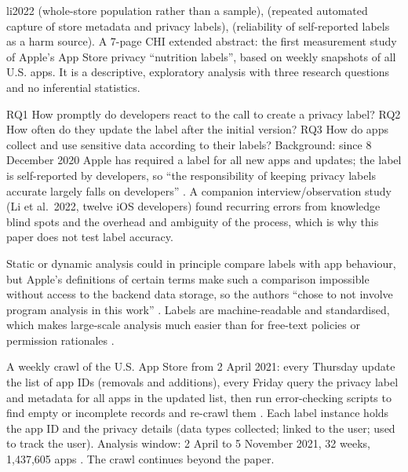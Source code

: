 \begin{papercard}{li2022}
  (whole-store population rather than a sample),  (repeated automated capture of store metadata and privacy labels),  (reliability of self-reported labels as a harm source). A 7-page CHI extended abstract: the first measurement study of Apple's App Store privacy ``nutrition labels'', based on weekly snapshots of all U.S. apps. It is a descriptive, exploratory analysis with three research questions and no inferential statistics.

 RQ1 How promptly do developers react to the call to create a privacy label? RQ2 How often do they update the label after the initial version? RQ3 How do apps collect and use sensitive data according to their labels?  Background: since 8 December 2020 Apple has required a label for all new apps and updates; the label is self-reported by developers, so ``the responsibility of keeping privacy labels accurate largely falls on developers'' . A companion interview/observation study (Li et al.\ 2022, twelve iOS developers) found recurring errors from knowledge blind spots and the overhead and ambiguity of the process, which is why this paper does not test label accuracy.

 Static or dynamic analysis could in principle compare labels with app behaviour, but Apple's definitions of certain terms make such a comparison impossible without access to the backend data storage, so the authors ``chose to not involve program analysis in this work'' . Labels are machine-readable and standardised, which makes large-scale analysis much easier than for free-text policies or permission rationales .

 A weekly crawl of the U.S. App Store from 2 April 2021: every Thursday update the list of app IDs (removals and additions), every Friday query the privacy label and metadata for all apps in the updated list, then run error-checking scripts to find empty or incomplete records and re-crawl them . Each label instance holds the app ID and the privacy details (data types collected; linked to the user; used to track the user). Analysis window: 2 April to 5 November 2021, 32 weeks, 1,437,605 apps . The crawl continues beyond the paper.


\end{papercard}
